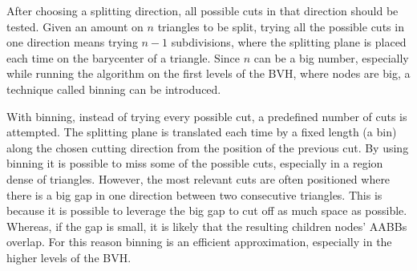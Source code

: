\documentclass{PoliMi_MasterThesis}
\begin{document}
After choosing a splitting direction, all possible cuts in that direction should be tested. Given an amount on $n$ triangles to be split, trying all the possible cuts in one direction means trying $n-1$ subdivisions, where the splitting plane is placed each time on the barycenter of a triangle. Since $n$ can be a big number, especially while running the algorithm on the first levels of the BVH, where nodes are big, a technique called binning can be introduced.

With binning, instead of trying every possible cut, a predefined number of cuts is attempted. The splitting plane is translated each time by a fixed length (a bin) along the chosen cutting direction from the position of the previous cut. By using binning it is possible to miss some of the possible cuts, especially in a region dense of triangles. However, the most relevant cuts are often positioned where there is a big gap in one direction between two consecutive triangles. This is because it is possible to leverage the big gap to cut off as much space as possible. Whereas, if the gap is small, it is likely that the resulting children nodes' AABBs overlap. For this reason binning is an efficient approximation, especially in the higher levels of the BVH.
\end{document}
